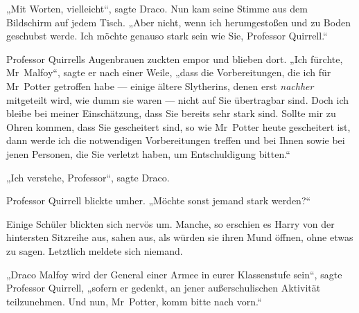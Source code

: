 „Mit Worten, vielleicht“, sagte Draco. Nun kam seine Stimme aus dem Bildschirm auf jedem Tisch.
„Aber nicht, wenn ich herumgestoßen und zu Boden geschubst werde. Ich möchte genauso stark sein wie Sie, Professor Quirrell.“

Professor Quirrells Augenbrauen zuckten empor und blieben dort.
„Ich fürchte, Mr~Malfoy“, sagte er nach einer Weile, „dass die Vorbereitungen, die ich für Mr~Potter getroffen habe — einige ältere Slytherins, denen erst \emph{nachher} mitgeteilt wird, wie dumm sie waren — nicht auf Sie übertragbar sind. Doch ich bleibe bei meiner Einschätzung, dass Sie bereits sehr stark sind. Sollte mir zu Ohren kommen, dass Sie gescheitert sind, so wie Mr~Potter heute gescheitert ist, dann werde ich die notwendigen Vorbereitungen treffen und bei Ihnen sowie bei jenen Personen, die Sie verletzt haben, um Entschuldigung bitten.“

„Ich verstehe, Professor“, sagte Draco.

Professor Quirrell blickte umher.
„Möchte sonst jemand stark werden?“

Einige Schüler blickten sich nervös um. Manche, so erschien es Harry von der hintersten Sitzreihe aus, sahen aus, als würden sie ihren Mund öffnen, ohne etwas zu sagen. Letztlich meldete sich niemand.

„Draco Malfoy wird der General einer Armee in eurer Klassenstufe sein“, sagte Professor Quirrell, „sofern er gedenkt, an jener außerschulischen Aktivität teilzunehmen. Und nun, Mr~Potter, komm bitte nach vorn.“

